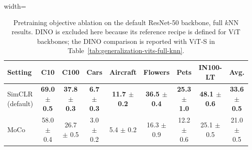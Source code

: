 \begin{table}[H]
\centering
\scriptsize
\setlength{\tabcolsep}{3.5pt}
\caption{Pretraining objective ablation on the default ResNet-50 backbone, full $k$NN results. DINO is excluded here because its reference recipe is defined for ViT backbones; the DINO comparison is reported with ViT-S in Table~\ref{tab:generalization-vits-full-knn}.}
\label{tab:app_pretraining_knn}
\begin{adjustbox}{width=\textwidth}
\begin{tabular}{l c c c c c c c c}
\toprule
Setting & C10 & C100 & Cars & Aircraft & Flowers & Pets & IN100-LT & Avg. \\
\midrule
SimCLR (default) & \textbf{69.0 {\scriptsize$\pm$ 0.5}} & \textbf{37.8 {\scriptsize$\pm$ 0.3}} & \textbf{6.7 {\scriptsize$\pm$ 0.3}} & \textbf{11.7 {\scriptsize$\pm$ 0.2}} & \textbf{36.5 {\scriptsize$\pm$ 0.4}} & \textbf{25.3 {\scriptsize$\pm$ 1.0}} & \textbf{48.1 {\scriptsize$\pm$ 0.6}} & \textbf{33.6 {\scriptsize$\pm$ 0.5}} \\
MoCo & 58.0 {\scriptsize$\pm$ 0.4} & 26.7 {\scriptsize$\pm$ 0.5} & 3.0 {\scriptsize$\pm$ 0.2} & 5.4 {\scriptsize$\pm$ 0.2} & 16.3 {\scriptsize$\pm$ 0.9} & 12.2 {\scriptsize$\pm$ 0.6} & 25.1 {\scriptsize$\pm$ 0.5} & 21.0 {\scriptsize$\pm$ 0.5} \\
\bottomrule
\end{tabular}
\end{adjustbox}
\end{table}
